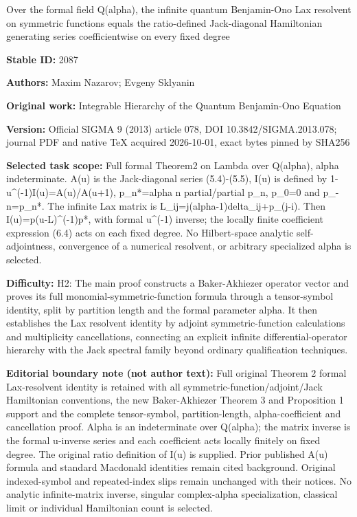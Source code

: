 \documentclass[11pt]{article}
\numberwithin{equation}{section}
\begin{document}
\begin{center}\Large Over the formal field Q(alpha), the infinite quantum Benjamin-Ono Lax resolvent on symmetric functions equals the ratio-defined Jack-diagonal Hamiltonian generating series coefficientwise on every fixed degree\end{center}
\noindent\textbf{Stable ID:} 2087\par
\noindent\textbf{Authors:} Maxim Nazarov; Evgeny Sklyanin\par
\noindent\textbf{Original work:} Integrable Hierarchy of the Quantum Benjamin-Ono Equation\par
\noindent\textbf{Version:} Official SIGMA 9 (2013) article 078, DOI 10.3842/SIGMA.2013.078; journal PDF and native TeX acquired 2026-10-01, exact bytes pinned by SHA256\par
\noindent\textbf{Selected task scope:} Full formal Theorem2 on Lambda over Q(alpha), alpha indeterminate. A(u) is the Jack-diagonal series (5.4)-(5.5), I(u) is defined by 1-u\textasciicircum{}(-1)I(u)=\allowbreak{}A(u)/A(u+\allowbreak{}1), p\_n*\allowbreak{}=\allowbreak{}alpha n partial/partial p\_n, p\_0=\allowbreak{}0 and p\_-n=\allowbreak{}p\_n*\allowbreak{}. The infinite Lax matrix is L\_ij=\allowbreak{}j(alpha-1)delta\_ij+\allowbreak{}p\_(j-i). Then I(u)=\allowbreak{}p(u-L)\textasciicircum{}(-1)p*\allowbreak{}, with formal u\textasciicircum{}(-1) inverse; the locally finite coefficient expression (6.4) acts on each fixed degree. No Hilbert-space analytic self-adjointness, convergence of a numerical resolvent, or arbitrary specialized alpha is selected.\par
\noindent\textbf{Difficulty:} H2: The main proof constructs a Baker-Akhiezer operator vector and proves its full monomial-symmetric-function formula through a tensor-symbol identity, split by partition length and the formal parameter alpha. It then establishes the Lax resolvent identity by adjoint symmetric-function calculations and multiplicity cancellations, connecting an explicit infinite differential-operator hierarchy with the Jack spectral family beyond ordinary qualification techniques.\par
\noindent\textbf{Editorial boundary note (not author text):} Full original Theorem 2 formal Lax-resolvent identity is retained with all symmetric-function/adjoint/Jack Hamiltonian conventions, the new Baker-Akhiezer Theorem 3 and Proposition 1 support and the complete tensor-symbol, partition-length, alpha-coefficient and cancellation proof. Alpha is an indeterminate over Q(alpha); the matrix inverse is the formal u-inverse series and each coefficient acts locally finitely on fixed degree. The original ratio definition of I(u) is supplied. Prior published A(u) formula and standard Macdonald identities remain cited background. Original indexed-symbol and repeated-index slips remain unchanged with their notices. No analytic infinite-matrix inverse, singular complex-alpha specialization, classical limit or individual Hamiltonian count is selected.\par
\end{document}
